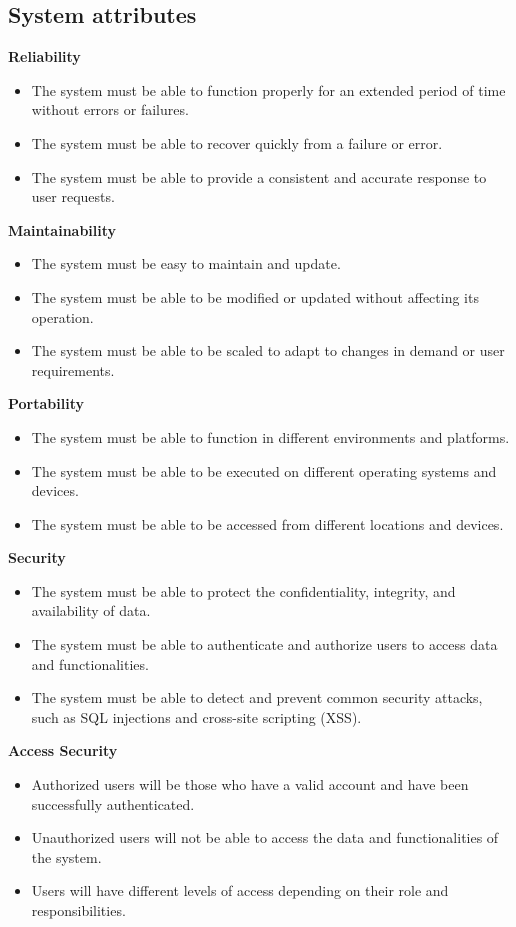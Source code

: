 \documentclass[12pt,a4paper, twosite]{article}
\begin{document}
\subsection{System attributes}
\label{sec:orgd0babc0}

\textbf{Reliability}    
\begin{itemize}
    \item The system must be able to function properly for an extended period of time without errors or failures.
    \item The system must be able to recover quickly from a failure or error.
    \item The system must be able to provide a consistent and accurate response to user requests.
\end{itemize}

\textbf{Maintainability}    
\begin{itemize}
    \item The system must be easy to maintain and update.
    \item The system must be able to be modified or updated without affecting its operation.
    \item The system must be able to be scaled to adapt to changes in demand or user requirements.
\end{itemize}

\textbf{Portability}    
\begin{itemize}
    \item The system must be able to function in different environments and platforms.
    \item The system must be able to be executed on different operating systems and devices.
    \item The system must be able to be accessed from different locations and devices.
\end{itemize}

\textbf{Security}    
\begin{itemize}
    \item The system must be able to protect the confidentiality, integrity, and availability of data.
    \item The system must be able to authenticate and authorize users to access data and functionalities.
    \item The system must be able to detect and prevent common security attacks, such as SQL injections and cross-site scripting (XSS).
\end{itemize}

\textbf{Access Security}    
\begin{itemize}
    \item Authorized users will be those who have a valid account and have been successfully authenticated.
    \item Unauthorized users will not be able to access the data and functionalities of the system.
    \item Users will have different levels of access depending on their role and responsibilities.
\end{itemize}
\end{document}
